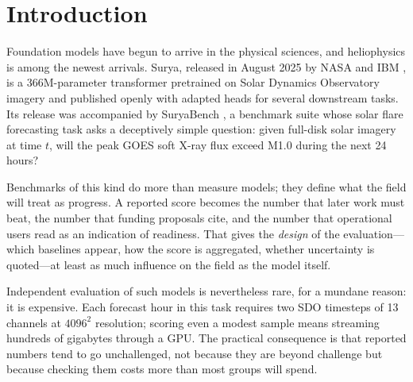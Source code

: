 \documentclass[11pt]{article}
\begin{document}
\begin{abstract}
Independently of our measurements, we document that the reported 0.436 cannot be
located: the released artifacts give three mutually incompatible split
definitions and the results table names none of them, while the two companion
papers report ResNet50 at TSS 0.018 and 0.261 for the same task, a reference
level less stable than the margin being claimed.

We therefore argue that the deficiency is not specific to Surya but structural to
the evaluation protocol, and we propose concrete fixes: mandatory cheap
baselines, per-regime rather than pooled reporting, explicit threshold
procedures, and uncertainty intervals computed over temporal blocks.
\end{abstract}

\section{Introduction}

Foundation models have begun to arrive in the physical sciences, and heliophysics
is among the newest arrivals. Surya, released in August 2025 by NASA and IBM
\citep{roy2025}, is a 366M-parameter transformer pretrained on Solar Dynamics
Observatory imagery and published openly with adapted heads for several
downstream tasks. Its release was accompanied by SuryaBench \citep{roy2026}, a
benchmark suite whose solar flare forecasting task asks a deceptively simple
question: given full-disk solar imagery at time $t$, will the peak GOES soft
X-ray flux exceed M1.0 during the next 24 hours?

Benchmarks of this kind do more than measure models; they define what the field
will treat as progress. A reported score becomes the number that later work must
beat, the number that funding proposals cite, and the number that operational
users read as an indication of readiness. That gives the \emph{design} of the
evaluation---which baselines appear, how the score is aggregated, whether
uncertainty is quoted---at least as much influence on the field as the model
itself.

Independent evaluation of such models is nevertheless rare, for a mundane reason:
it is expensive. Each forecast hour in this task requires two SDO timesteps of 13
channels at $4096^2$ resolution; scoring even a modest sample means streaming
hundreds of gigabytes through a GPU. The practical consequence is that reported
numbers tend to go unchallenged, not because they are beyond challenge but
because checking them costs more than most groups will spend.
\end{document}
